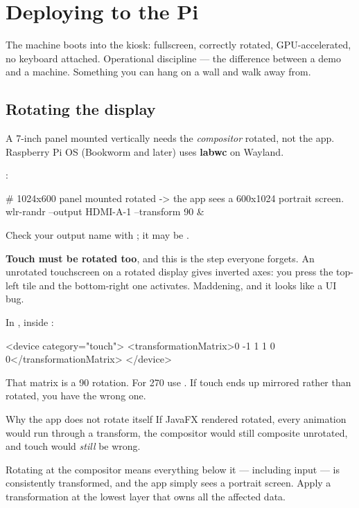 \chapter{Deploying to the Pi}
\label{ch:deploy}

\chapterbrief
  {The machine boots into the kiosk: fullscreen, correctly rotated, GPU-accelerated, no keyboard attached.}
  {Operational discipline --- the difference between a demo and a machine.}
  {Something you can hang on a wall and walk away from.}

\section{Rotating the display}

A 7-inch panel mounted vertically needs the \emph{compositor} rotated, not the
app. Raspberry Pi OS (Bookworm and later) uses \textbf{labwc} on Wayland.

:

\begin{shell}
# 1024x600 panel mounted rotated -> the app sees a 600x1024 portrait screen.
wlr-randr --output HDMI-A-1 --transform 90 &
\end{shell}

Check your output name with ; it may be .

\textbf{Touch must be rotated too}, and this is the step everyone forgets. An
unrotated touchscreen on a rotated display gives inverted axes: you press the
top-left tile and the bottom-right one activates. Maddening, and it looks like a
UI bug.

In , inside :

\begin{xcode}
<device category="touch">
  <transformationMatrix>0 -1 1 1 0 0</transformationMatrix>
</device>
\end{xcode}

That matrix is a 90\textdegree{} rotation. For 270\textdegree{} use
. If touch ends up mirrored rather than rotated, you have the
wrong one.

\begin{concept}{Why the app does not rotate itself}
If JavaFX rendered rotated, every animation would run through a transform, the
compositor would still composite unrotated, and touch would \emph{still} be
wrong.

Rotating at the compositor means everything below it --- including input --- is
consistently transformed, and the app simply sees a portrait screen. Apply a
transformation at the lowest layer that owns all the affected data.
\end{concept}


